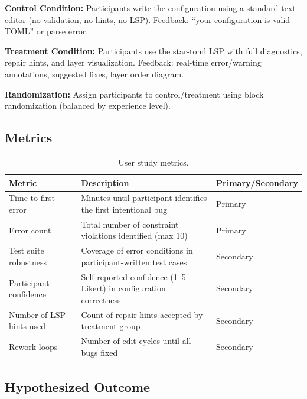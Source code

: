 \documentclass[12pt, letterpaper]{report}
\theoremstyle{plain}
\theoremstyle{definition}
\theoremstyle{remark}
\begin{document}
\textbf{Control Condition:} Participants write the configuration using
a standard text editor (no validation, no hints, no LSP).
Feedback: ``your configuration is valid TOML'' or parse error.

\textbf{Treatment Condition:} Participants use the star-toml LSP with
full diagnostics, repair hints, and layer visualization.
Feedback: real-time error/warning annotations, suggested fixes,
layer order diagram.

\textbf{Randomization:} Assign participants to control/treatment using
block randomization (balanced by experience level).

\subsection{Metrics}

\begin{table}[h]
\centering
\renewcommand{\arraystretch}{1.35}
\begin{tabular}{@{}lp{5.5cm}l@{}}
\toprule
\textbf{Metric} & \textbf{Description} & \textbf{Primary/Secondary} \\
\midrule
Time to first error & Minutes until participant identifies the first intentional bug & Primary \\
Error count & Total number of constraint violations identified (max 10) & Primary \\
Test suite robustness & Coverage of error conditions in participant-written test cases & Secondary \\
Participant confidence & Self-reported confidence (1--5 Likert) in configuration correctness & Secondary \\
Number of LSP hints used & Count of repair hints accepted by treatment group & Secondary \\
Rework loops & Number of edit cycles until all bugs fixed & Secondary \\
\bottomrule
\end{tabular}
\caption{User study metrics.}
\label{tab:userstudy}
\end{table}

\subsection{Hypothesized Outcome}
\end{document}
